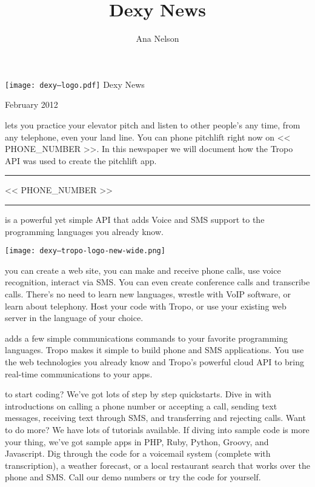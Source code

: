 \documentclass[custom, plainsections]{sciposter}
\title{Dexy News}
\author{Ana Nelson}
\begin{document}
\rmfamily

\begin{megasize}
\texttt{[image: dexy--logo.pdf]}
\hspace{0.1in}
Dexy News
\end{megasize} \hfill February 2012

\begin{multicols*}{3}

\small

 lets you practice your elevator pitch and listen to other people's any time, from any telephone, even your land line. You can phone pitchlift right now on << PHONE_NUMBER >>. In this newspaper we will document how the Tropo API was used to create the pitchlift app.

\vspace{0.5cm}
\hrule
\Large
\begin{center}
\vspace{0.2cm}
<< PHONE_NUMBER >>
\end{center}
\small
\hrule

\vspace{1cm}

 is a powerful yet simple API that adds Voice and SMS support to the programming languages you already know.

\vspace{0.7cm}
\texttt{[image: dexy--tropo-logo-new-wide.png]}
\vspace{0.5cm}

 you can create a web site, you can make and receive phone calls, use voice recognition, interact via SMS. You can even create conference calls and transcribe calls. There's no need to learn new languages, wrestle with VoIP software, or learn about telephony. Host your code with Tropo, or use your existing web server in the language of your choice.

 adds a few simple communications commands to your favorite programming languages. Tropo makes it simple to build phone and SMS applications.  You use the web technologies you already know and Tropo's powerful cloud API to bring real-time communications to your apps.

 to start coding? We've got lots of step by step quickstarts. Dive in with introductions on calling a phone number or accepting a call, sending text messages, receiving text through SMS, and transferring and rejecting calls. Want to do more? We have lots of tutorials available. If diving into sample code is more your thing, we've got sample apps in PHP, Ruby, Python, Groovy, and Javascript. Dig through the code for a voicemail system (complete with transcription), a weather forecast, or a local restaurant search that works over the phone and SMS. Call our demo numbers or try the code for yourself.


\end{multicols*}
\end{document}
